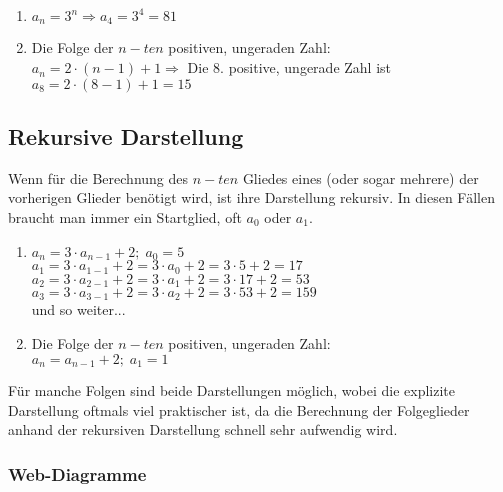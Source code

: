 \documentclass[main.tex]{subfiles}
\begin{document}
\begin{Beispiel}
	\begin{enumerate}
		\item $a_{n}=3^n \Rightarrow a_{4}=3^4=81$
		\item Die Folge der $n-ten$ positiven, ungeraden Zahl:\\
		$a_{n}=2\cdot(n-1)+1 \Rightarrow$ Die 8. positive, ungerade Zahl ist $ a_{8}=2\cdot(8-1)+1=15$
	\end{enumerate}
\end{Beispiel}


	\subsection{Rekursive Darstellung}

\begin{Definition}
Wenn für die Berechnung des $n-ten$ Gliedes eines (oder sogar mehrere) der vorherigen Glieder benötigt wird, ist ihre Darstellung rekursiv.
In diesen Fällen braucht man immer ein Startglied, oft $a_{0}$ oder $ a_{1}$.
\end{Definition}

\begin{Beispiel}
\begin{enumerate}
\item  $a_{n}=3\cdot a_{n-1}+2;\;a_{0}=5$\\
\indent$a_{1}=3\cdot a_{1-1}+2=3\cdot a_{0}+2=3\cdot5+2=17$\\
\indent$a_{2}=3\cdot a_{2-1}+2=3\cdot a_{1}+2=3\cdot17+2=53$\\
\indent$a_{3}=3\cdot a_{3-1}+2=3\cdot a_{2}+2=3\cdot53+2=159$\\
\indent und so weiter...
\item Die Folge der $n-ten$ positiven, ungeraden Zahl:\\
$a_{n}=a_{n-1}+2;\;a_{1}=1$
\end{enumerate}
\end{Beispiel}

\begin{Bemerkung}
Für manche Folgen sind beide Darstellungen möglich, wobei die explizite Darstellung oftmals viel praktischer ist, da die Berechnung der Folgeglieder anhand der rekursiven Darstellung schnell sehr aufwendig wird.
\end{Bemerkung}

\subsubsection{Web-Diagramme}
\end{document}
